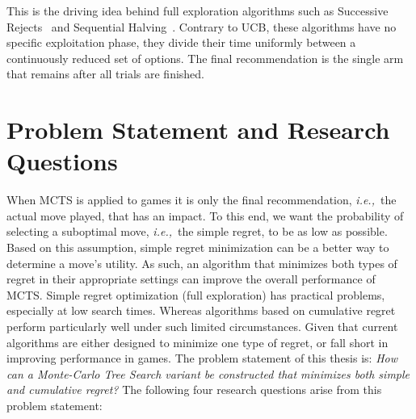 \documentclass{kecsmstr}
\newcommand{\ie}{{\it i.e.,}~}
\begin{document}
This is the driving idea behind full exploration algorithms such as Successive Rejects~ and Sequential Halving~. Contrary to UCB, these algorithms have no specific exploitation phase, they divide their time uniformly between a continuously reduced set of options. The final recommendation is the single arm that remains after all trials are finished.

\section{Problem Statement and Research Questions}
When MCTS is applied to games it is only the final recommendation, \ie the actual move played, that has an impact. To this end, we want the probability of selecting a suboptimal move, \ie the simple regret, to be as low as possible. Based on this assumption, simple regret minimization can be a better way to determine a move's utility. As such, an algorithm that minimizes both types of regret in their appropriate settings can improve the overall performance of MCTS. Simple regret optimization (full exploration) has practical problems, especially at low search times. Whereas algorithms based on cumulative regret perform particularly well under such limited circumstances. Given that current algorithms are either designed to minimize one type of regret, or fall short in improving performance in games. The problem statement of this thesis is:
\newline \newline
\emph{How can a Monte-Carlo Tree Search variant be constructed that minimizes both simple and cumulative regret?}
\newline \newline
The following four research questions arise from this problem statement:
\end{document}
